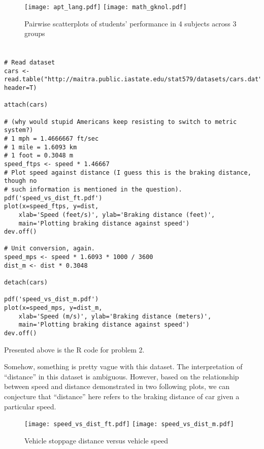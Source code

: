 \documentclass[letter]{article}
\begin{document}
    \begin{figure}[htp]
        \centering
        \texttt{[image: apt\_lang.pdf]}
        \texttt{[image: math\_gknol.pdf]}
        \caption{Pairwise scatterplots of students' performance in 4
        subjects across 3 groups}
        \label{fig:scatterplot}
    \end{figure}

    \section{}
    \begin{verbatim}
# Read dataset
cars <- read.table("http://maitra.public.iastate.edu/stat579/datasets/cars.dat", header=T)

attach(cars)

# (why would stupid Americans keep resisting to switch to metric system?)
# 1 mph = 1.4666667 ft/sec
# 1 mile = 1.6093 km
# 1 foot = 0.3048 m
speed_ftps <- speed * 1.46667
# Plot speed against distance (I guess this is the braking distance, though no 
# such information is mentioned in the question).
pdf('speed_vs_dist_ft.pdf')
plot(x=speed_ftps, y=dist, 
    xlab='Speed (feet/s)', ylab='Braking distance (feet)',
    main='Plotting braking distance against speed')
dev.off()

# Unit conversion, again.
speed_mps <- speed * 1.6093 * 1000 / 3600 
dist_m <- dist * 0.3048

detach(cars)

pdf('speed_vs_dist_m.pdf')
plot(x=speed_mps, y=dist_m, 
    xlab='Speed (m/s)', ylab='Braking distance (meters)',
    main='Plotting braking distance against speed')
dev.off()
    \end{verbatim}
    Presented above is the R code for problem 2. 

    Somehow, something is pretty vague with this dataset. The interpretation of
    ``distance'' in this dataset is ambiguous. However, based on the
    relationship between speed and distance demonstrated in two following
    plots, we can conjecture that ``distance'' here refers to the braking
    distance of car given a particular speed. 

    \begin{figure}[htp]
        \centering
        \texttt{[image: speed\_vs\_dist\_ft.pdf]}
        \texttt{[image: speed\_vs\_dist\_m.pdf]}
        \caption{Vehicle stoppage distance versus vehicle speed}
        \label{fig:dist_speed}
    \end{figure}
\end{document}
